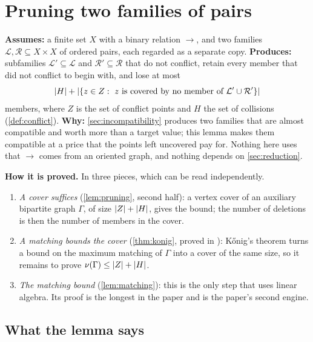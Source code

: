 \section{Pruning two families of pairs}\label{sec:pruning}

\begin{contract}
\textbf{Assumes:} a finite set $X$ with a binary relation $\to$, and two families
$\mathcal L,\mathcal R\subseteq X\times X$ of ordered pairs, each regarded as a separate copy.
\quad
\textbf{Produces:} subfamilies $\mathcal L'\subseteq\mathcal L$ and $\mathcal R'\subseteq\mathcal R$
that do not conflict, retain every member that did not conflict to begin with, and lose at most
\[
 \lvert H\rvert+\lvert \{z\in Z:\ z\text{ is covered by no member of }\mathcal L'\cup\mathcal R'\}\rvert
\]
members, where $Z$ is the set of conflict points and $H$ the set of collisions
(\cref{def:conflict}). \quad
\textbf{Why:} \cref{sec:incompatibility} produces two families that are almost compatible and
worth more than a target value; this lemma makes them compatible at a price that the points left
uncovered pay for. Nothing here uses that $\to$ comes from an oriented graph, and nothing depends
on \cref{sec:reduction}.

\textbf{How it is proved.} In three pieces, which can be read independently.
\begin{enumerate}[label=(\alph*),leftmargin=1.5em,itemsep=1pt,topsep=1pt]
\item \emph{A cover suffices} (\cref{lem:pruning}, second half): a vertex cover of an auxiliary
  bipartite graph $\Gamma$, of size $\lvert Z\rvert+\lvert H\rvert$, gives the bound; the number of deletions is
  then the number of members in the cover.
\item \emph{A matching bounds the cover} (\cref{thm:konig}, proved in ): K\H{o}nig's
  theorem turns a bound on the maximum matching of $\Gamma$ into a cover of the same size, so it
  remains to prove $\nu(\Gamma)\le\lvert Z\rvert+\lvert H\rvert$.
\item \emph{The matching bound} (\cref{lem:matching}): this is the only step that uses linear
  algebra. Its proof is the longest in the paper and is the paper's second engine.
\end{enumerate}
\end{contract}

\subsection{What the lemma says}\label{sec:pruning-statement}

